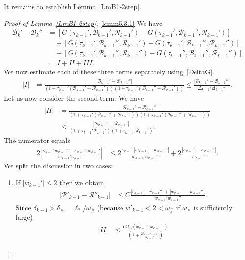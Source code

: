 \documentclass[AHL, Unicode, longabstracts,published]{cedram}
\newcommand{\ct}{r}
\newcommand{\curv}{\kappa}
\newcommand{\cB}{\mathcal{B}}
\newcommand{\cR}{\mathcal{R}}
\newcommand{\cpar}{\mathcal{R}}
\newcommand{\privatel}[1]{#1_*}
\newcommand{\elll}{\privatel{\ell}}
\newcommand{\law}[1]{\omega_{#1}}
\newcommand{\lawc}{\law{\#}}
\newcommand*\RmIII{{{I\!\!I\!\!I}}}
\newcommand*\RmII{{{I\!\!I}}}
\newcommand*{\relabel}{\renewcommand{\labelenumi}{(\theenumi)}}
\newcommand*{\Alphenumi}{\renewcommand*{\theenumi}{\Alph{enumi}}\relabel}
\begin{document}
It remains to establish Lemma~\ref{LmB1-2step}.
\begin{proof}[Proof of Lemma~\ref{LmB1-2step}]
\noindent\eqref{lemm5.3.1} We have
\begin{align*}
\cB_k'-\cB_k''&= \left[G\left(\tau_{k-1}', \cB_{k-1}', \cpar_{k-1}'\right)- G\left(\tau_{k-1}', \cB_{k-1}'', \cpar_{k-1}'\right)\right]\\
&\quad +\left[G\left(\tau_{k-1}', \cB_{k-1}'', \cpar_{k-1}'\right)- G\left(\tau_{k-1}', \cB_{k-1}'', \cpar_{k-1}''\right)\right]\\
&\quad +\left[G\left(\tau_{k-1}', \cB_{k-1}'', \cpar_{k-1}''\right)- G\left(\tau_{k-1}'', \cB_{k-1}'', \cpar_{k-1}''\right)\right]\\
&=I+\RmII+\RmIII.
\end{align*}
We now estimate each of these three terms separately using~\eqref{DeltaG}.
\begin{align*}
|I| &= \frac{ |\cB_{k-1}'-\cB_{k-1}''|}{\left(1+\tau_{k-1}'(\cB_{k-1}'+\cpar_{k-1}')\right)\left(1+\tau_{k-1}'(\cB_{k-1}''+\cpar_{k-1}')\right)}
\leq \frac{ |\cB_{k-1}'-\cB_{k-1}''|}{\Delta_{k-1}' \Delta_{k-1}''}.
\end{align*}
Let us now consider the second term. We have
\begin{align*}
|\RmII| &= \frac{ |\cpar_{k-1}'-\cpar_{k-1}''|} {\left(1+\tau_{k-1}'(\cB_{k-1}''+\cpar_{k-1}')\right)\left(1+\tau_{k-1}'(\cB_{k-1}''+\cpar_{k-1}'')\right)} \\
&\leq \frac{ |\cpar_{k-1}'-\cpar_{k-1}''|} {(1+\tau_{k-1}'\cpar_{k-1}')(1+\tau_{k-1}'\cpar_{k-1}'')}.
\end{align*}
The numerator equals
\begin{align*}
2\left|\frac{\curv_{k-1}' w_{k-1}''-\curv_{k-1}''w_{k-1}'}{w_{k-1}' w_{k-1}''}\right| &\leq 2\frac{\curv_{k-1}'|w_{k-1}'-w_{k-1}''|}{w_{k-1}' w_{k-1}''}+ 2\frac{|\curv_{k-1}'-\curv_{k-1}''|}{w_{k-1}''}.
\end{align*}
We split the discussion in two cases:
\begin{enumerate}\Alphenumi
\item\label{A} If $|w_{k-1}'|\leq 2$ then we obtain
\begin{align*}
|\cR'_{k-1}-\cR''_{k-1}| &\leq C \frac{|\ct_{k-1}'-\ct_{k-1}''|+|w_{k-1}'-w_{k-1}''|}{w_{k-1}' w_{k-1}''}.
\end{align*}
Since $\delta_{k-1} > \delta_{\#} = \elll/\lawc$ (because $w'_{k-1} < 2 < \lawc$ if $\lawc$ is sufficiently large)
\begin{align*}
|\RmII| &\leq \frac{C d_E(x_{k-1}', x_{k-1}'')} {\left(1+\frac{2\delta_{k-1} \curv_{k-1}'}{w_{k-1}'}\right)
}
\end{align*}
\end{enumerate}
\end{proof}
\end{document}
